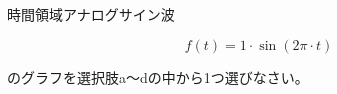 時間領域アナログサイン波

\[
f(t) = 1 \cdot \sin( 2 \pi \cdot t )
\]

\bigskip
\noindent  のグラフを選択肢a〜dの中から1つ選びなさい。
